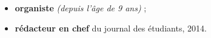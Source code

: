 
\begin{itemize}[leftmargin=1em]
  \itemsep0pt  \parskip0pt
\item \textbf{organiste} \textsl{(depuis l'âge de 9 ans)}
  ;
\item \textbf{rédacteur en chef} du journal des étudiants, 2014.
\end{itemize}

